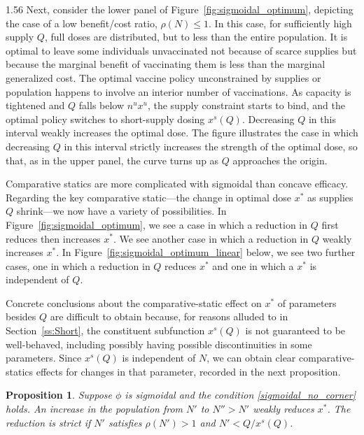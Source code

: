 \documentclass[12pt]{article}
\newcommand{\efficacy}{\phi}
\newcommand{\ratio}{\rho(N)}
\newcommand{\xshort}{x^{s}}
\newcommand{\xun}{x^{u}}
\newcommand{\nun}{n^{u}}
\newtheorem{proposition}{Proposition}
\begin{document}
\begin{spacing}{1.56}
Next, consider the lower panel of Figure~\ref{fig:sigmoidal_optimum}, depicting the case of a low benefit/cost ratio, $\ratio \leq 1$. In this case, for sufficiently high supply $Q$, full doses are distributed, but to less than the entire population. It is optimal to leave some individuals unvaccinated not because of scarce supplies but because the marginal benefit of vaccinating them is less than the marginal generalized cost. The optimal vaccine policy unconstrained by supplies or population happens to involve an interior number of vaccinations. As capacity is tightened and $Q$ falls below
$\nun \xun$, the supply constraint starts to bind, and the optimal policy switches to short-supply dosing $\xshort(Q)$. Decreasing $Q$ in this interval weakly increases the optimal dose. The figure illustrates the case in which decreasing $Q$ in this interval strictly increases the strength of the optimal dose, so that, as in the upper panel, the curve turns up as $Q$ approaches the origin.    

Comparative statics are more complicated with sigmoidal than concave efficacy. Regarding the key comparative static---the change in optimal dose $x^*$ as supplies $Q$ shrink---we now have a variety of possibilities. In Figure~\ref{fig:sigmoidal_optimum}, we see a case in which a reduction in $Q$ first reduces then increases $x^*$. We see another case in which a reduction in $Q$ weakly increases $x^*$. In Figure~\ref{fig:sigmoidal_optimum_linear} below, we see two further cases, one in which a reduction in $Q$ reduces $x^*$ and one in which a $x^*$ is independent of $Q$.  

Concrete conclusions about the comparative-static effect on $x^*$ of parameters besides $Q$ are difficult to obtain because, for reasons alluded to in Section~\ref{ss:Short}, the constituent subfunction $\xshort(Q)$ is not guaranteed to be well-behaved, including possibly having possible discontinuities in some parameters. Since $\xshort(Q)$ is independent of $N$, we can obtain clear comparative-statics effects for changes in that parameter, recorded in the next proposition.

 \begin{proposition}
\label{p:cs_sigmoidal}
\singlespace
Suppose $\efficacy$ is sigmoidal and the condition
\eqref{sigmoidal_no_corner} holds. An increase in the population from $N'$ to $N'' > N'$ weakly reduces $x^*$. The reduction is strict if $N'$ satisfies $\rho(N') > 1$ and $N' < Q / \xshort(Q)$.   
\end{proposition}


\end{spacing}
\end{document}
